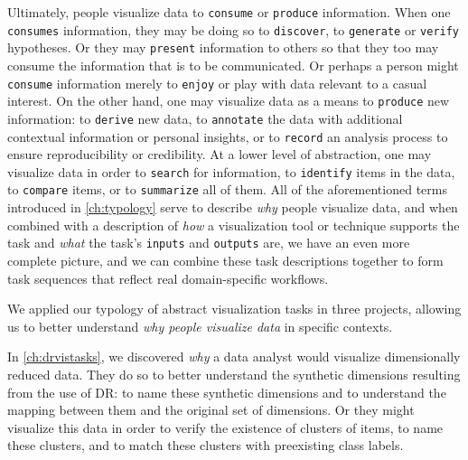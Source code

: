Ultimately, people visualize data to {\tt consume} or {\tt produce} information. 
When one {\tt consumes} information, they may be doing so to {\tt discover}, to {\tt generate} or {\tt verify} hypotheses.
Or they may {\tt present} information to others so that they too may consume the information that is to be communicated.
Or perhaps a person might {\tt consume} information merely to {\tt enjoy} or play with data relevant to a casual interest.
On the other hand, one may visualize data as a means to {\tt produce} new information: to {\tt derive} new data, to {\tt annotate} the data with additional contextual information or personal insights, or to {\tt record} an analysis process to ensure reproducibility or credibility. 
At a lower level of abstraction, one may visualize data in order to {\tt search} for information, to {\tt identify} items in the data, to {\tt compare} items, or to {\tt summarize} all of them.
All of the aforementioned terms introduced in \autoref{ch:typology} serve to describe {\it why} people visualize data, and when combined with a description of {\it how} a visualization tool or technique supports the task and {\it what} the task's {\tt inputs} and {\tt outputs} are, we have an even more complete picture, and we can combine these task descriptions together to form task sequences that reflect real domain-specific workflows.

We applied our typology of abstract visualization tasks in three projects, allowing us to better understand {\it why people visualize data} in specific contexts.

In \autoref{ch:drvistasks}, we discovered {\it why} a data analyst would visualize dimensionally reduced data.
They do so to better understand the synthetic dimensions resulting from the use of \ac{DR}: to name these synthetic dimensions and to understand the mapping between them and the original set of dimensions.
Or they might visualize this data in order to verify the existence of clusters of items, to name these clusters, and to match these clusters with preexisting class labels.

